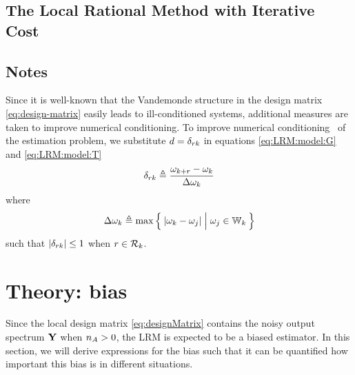 
\subsection{The Local Rational Method with Iterative Cost}

\subsection{Notes}

Since it is well-known that the Vandemonde structure in the design matrix \eqref{eq:design-matrix} easily leads to ill-conditioned systems, additional measures are taken to improve numerical conditioning.
To improve numerical conditioning~\citep{Pintelon2005} of the estimation problem, we substitute $d = \delta_{rk}$ in equations \eqref{eq:LRM:model:G} and \eqref{eq:LRM:model:T}
\begin{equation}
\delta_{rk} \triangleq \frac{\omega_{k+r} - \omega_k}{\Delta \omega_k}
\label{eq:freqScaling}
\end{equation}
where
\begin{equation}
  \Delta \omega_k \isdef
  \max
  \Set{
    \abs{ \omega_k - \omega_j} |  \vphantom{\frac{a}{b}}  \omega_j \in \LocalWindow[k]
  }
\end{equation}
such that $\left| \delta_{rk} \right| \leq 1$ when $r \in \mathcal{R}_{k}$.



\section{Theory: bias}
\label{sec:biascalc}
Since the local design matrix \eqref{eq:designMatrix} contains the noisy output spectrum $\mathbf{Y}$ when $n_{A} > 0$, the \gls{LRM} is expected to be a biased estimator.
In this section, we will derive expressions for the bias such that it can be quantified how important this bias is in different situations.

